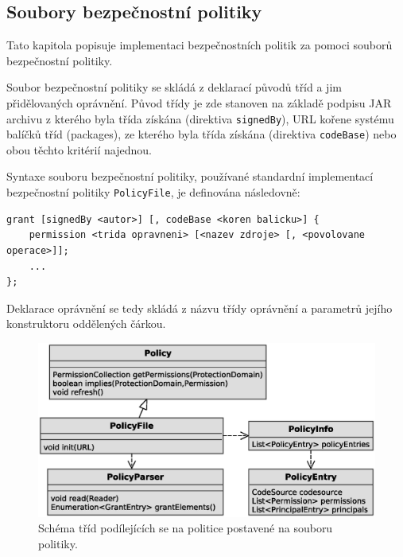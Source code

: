 \subsection{Soubory bezpečnostní politiky}

Tato kapitola popisuje implementaci bezpečnostních politik za pomoci souborů bezpečnostní politiky.

Soubor bezpečnostní politiky se skládá z deklarací původů tříd a jim přidělovaných oprávnění.
Původ třídy je zde stanoven na základě podpisu JAR archivu z kterého byla třída získána (direktiva {\tt signedBy}), URL kořene systému balíčků tříd (packages), ze kterého byla třída získána (direktiva {\tt codeBase}) nebo obou těchto kritérií najednou. \cite[5.3.1]{oaks}

Syntaxe souboru bezpečnostní politiky, používané standardní implementací bezpečnostní politiky {\tt PolicyFile}, je definována následovně: \cite[5.3.1]{oaks}

\begin{lstlisting}[caption=Syntaxe souboru bezpečnostní politiky, label=syntaxeSouboruBP]
grant [signedBy <autor>] [, codeBase <koren balicku>] {
    permission <trida opravneni> [<nazev zdroje> [, <povolovane operace>]];
    ...
};
\end{lstlisting}

Deklarace oprávnění se tedy skládá z názvu třídy oprávnění a parametrů jejího konstruktoru oddělených čárkou.

\begin{figure}[ht]
  \centering
  \includegraphics[width=14cm]{fig/policy-schema}
  \caption{Schéma tříd podílejících se na politice postavené na souboru politiky.}
\end{figure}

